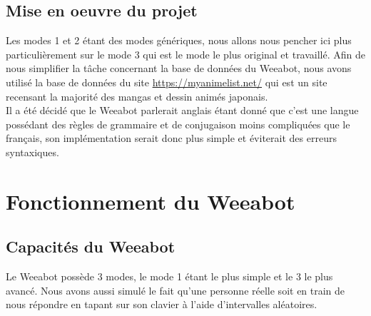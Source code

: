 \documentclass[paper=a4, fontsize=11pt]{article}
\begin{document}
\subsection{Mise en oeuvre du projet}
Les modes 1 et 2 étant des modes génériques, nous allons nous pencher ici plus particulièrement sur le mode 3 qui est le mode le plus original et travaillé. Afin de nous simplifier la tâche concernant la base de données du Weeabot, nous avons utilisé la base de données du site \url{https://myanimelist.net/} qui est un site recensant la majorité des mangas et dessin animés japonais.\\
Il a été décidé que le Weeabot parlerait anglais étant donné que c'est une langue possédant des règles de grammaire et de conjugaison moins compliquées que le français, son implémentation serait donc plus simple et éviterait des erreurs syntaxiques.\\


\section{Fonctionnement du Weeabot}



\subsection{Capacités du Weeabot}
Le Weeabot possède 3 modes, le mode 1 étant le plus simple et le 3 le plus avancé. Nous avons aussi simulé le fait qu'une personne réelle soit en train de nous répondre en tapant sur son clavier à l'aide d'intervalles aléatoires.\\
\end{document}
